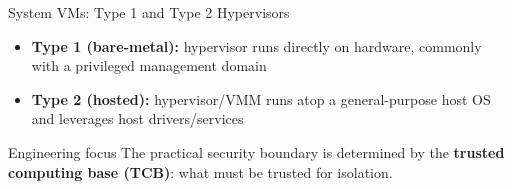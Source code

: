 \begin{frame}{System VMs: Type 1 and Type 2 Hypervisors}
  \begin{itemize}
    \item \textbf{Type 1 (bare-metal):} hypervisor runs directly on hardware, commonly with a privileged management domain
    \item \textbf{Type 2 (hosted):} hypervisor/VMM runs atop a general-purpose host OS and leverages host drivers/services
  \end{itemize}

  \vspace{0.4em}
  \begin{block}{Engineering focus}
    The practical security boundary is determined by the \textbf{trusted computing base (TCB)}: what must be trusted for isolation.
  \end{block}
\end{frame}

